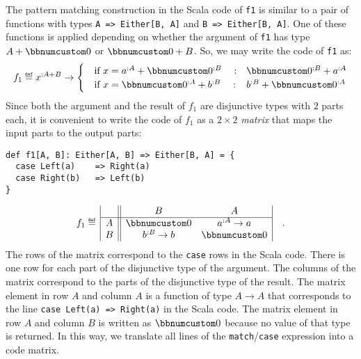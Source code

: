 The pattern matching construction in the Scala code of \lstinline!f1!
is similar to a pair of functions with types \lstinline!A => Either[B, A]!
and \lstinline!B => Either[B, A]!. One of these functions is applied
depending on whether the argument of \lstinline!f1! has type $A+\bbnum 0$
or $\bbnum 0+B$. So, we may write the code of \lstinline!f1! as:
\[
f_{1}\triangleq x^{:A+B}\rightarrow\begin{cases}
\quad\text{if }x=a^{:A}+\bbnum 0^{:B}\quad: & \bbnum 0^{:B}+a^{:A}\\
\quad\text{if }x=\bbnum 0^{:A}+b^{:B}\quad: & b^{:B}+\bbnum 0^{:A}
\end{cases}
\]
Since both the argument and the result of $f_{1}$ are disjunctive
types with $2$ parts each, it is convenient to write the code of
$f_{1}$ as a $2\times2$ \emph{matrix} that maps the input parts
to the output parts:
\begin{lstlisting}
def f1[A, B]: Either[A, B] => Either[B, A] = {
  case Left(a)    => Right(a)
  case Right(b)   => Left(b)
}
\end{lstlisting}
\[
f_{1}\triangleq\,\begin{array}{|c||cc|}
 & B & A\\
\hline A & \bbnum 0 & a^{:A}\rightarrow a\\
B & b^{:B}\rightarrow b & \bbnum 0
\end{array}\quad.
\]
The rows of the matrix correspond to the \lstinline!case! rows in
the Scala code. There is one row for each part of the disjunctive
type of the argument. The columns of the matrix correspond to the
parts of the disjunctive type of the result.
The matrix element in row $A$ and column $A$ is a function of type
$A\rightarrow A$ that corresponds to the line \lstinline!case Left(a) => Right(a)!
in the Scala code. The matrix element in row $A$ and column $B$
is written as $\bbnum 0$ because no value of that type is returned.
In this way, we translate all lines of the \lstinline!match!/\lstinline!case!
expression into a code matrix.

